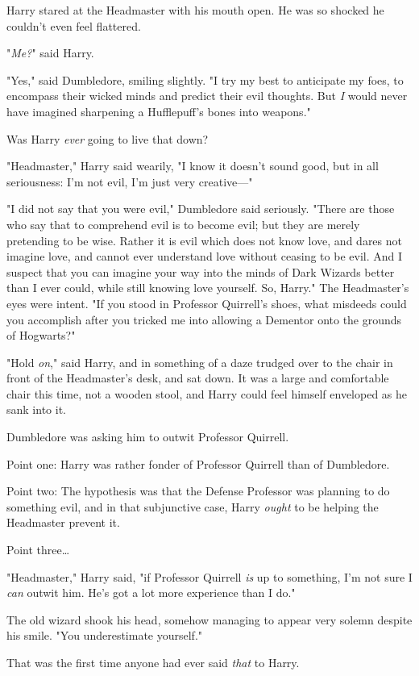 Harry stared at the Headmaster with his mouth open. He was so shocked he
couldn't even feel flattered.

"\emph{Me?}" said Harry.

"Yes," said Dumbledore, smiling slightly. "I try my best to anticipate my foes,
to encompass their wicked minds and predict their evil thoughts. But \emph{I}
would never have imagined sharpening a Hufflepuff's bones into weapons."

Was Harry \emph{ever} going to live that down?

"Headmaster," Harry said wearily, "I know it doesn't sound good, but in all
seriousness: I'm not evil, I'm just very creative---"

"I did not say that you were evil," Dumbledore said seriously. "There are those
who say that to comprehend evil is to become evil; but they are merely
pretending to be wise. Rather it is evil which does not know love, and dares
not imagine love, and cannot ever understand love without ceasing to be evil.
And I suspect that you can imagine your way into the minds of Dark Wizards
better than I ever could, while still knowing love yourself. So, Harry." The
Headmaster's eyes were intent. "If you stood in Professor Quirrell's shoes,
what misdeeds could you accomplish after you tricked me into allowing a
Dementor onto the grounds of Hogwarts?"

"Hold \emph{on}," said Harry, and in something of a daze trudged over to the
chair in front of the Headmaster's desk, and sat down. It was a large and
comfortable chair this time, not a wooden stool, and Harry could feel himself
enveloped as he sank into it.

Dumbledore was asking him to outwit Professor Quirrell.

Point one: Harry was rather fonder of Professor Quirrell than of Dumbledore.

Point two: The hypothesis was that the Defense Professor was planning to do
something evil, and in that subjunctive case, Harry \emph{ought} to be helping
the Headmaster prevent it.

Point three{\ldots}

"Headmaster," Harry said, "if Professor Quirrell \emph{is} up to something, I'm
not sure I \emph{can} outwit him. He's got a lot more experience than I do."

The old wizard shook his head, somehow managing to appear very solemn despite
his smile. "You underestimate yourself."

That was the first time anyone had ever said \emph{that} to Harry.


